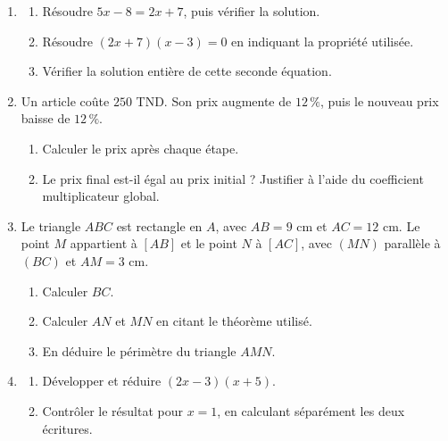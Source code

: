 \documentclass[10pt,a4paper]{article}
\begin{document}
\begin{enumerate}
\needspace{22mm}
\item[\textbf{B1.}] \begin{enumerate}
\item Résoudre $5x - 8 = 2x + 7$, puis vérifier la solution.
\item Résoudre $(2x + 7)(x - 3) = 0$ en indiquant la propriété utilisée.
\item Vérifier la solution entière de cette seconde équation.
\end{enumerate}
\par\vspace{1.2mm}
\needspace{22mm}
\item[\textbf{B2.}] Un article coûte $250$ TND. Son prix augmente de $12\,\%$, puis le nouveau prix baisse de $12\,\%$.
\begin{enumerate}
\item Calculer le prix après chaque étape.
\item Le prix final est-il égal au prix initial ? Justifier à l'aide du coefficient multiplicateur global.
\end{enumerate}
\par\vspace{1.2mm}
\needspace{22mm}
\item[\textbf{B3.}] Le triangle $ABC$ est rectangle en $A$, avec $AB = 9$ cm et $AC = 12$ cm.
Le point $M$ appartient à $[AB]$ et le point $N$ à $[AC]$, avec $(MN)$ parallèle à $(BC)$ et $AM = 3$ cm.
\begin{enumerate}
\item Calculer $BC$.
\item Calculer $AN$ et $MN$ en citant le théorème utilisé.
\item En déduire le périmètre du triangle $AMN$.
\end{enumerate}
\par\vspace{1.2mm}
\needspace{22mm}
\item[\textbf{B4.}] \begin{enumerate}
\item Développer et réduire $(2x - 3)(x + 5)$.
\item Contrôler le résultat pour $x = 1$, en calculant séparément les deux écritures.
\end{enumerate}
\par\vspace{1.2mm}
\end{enumerate}
\end{document}
